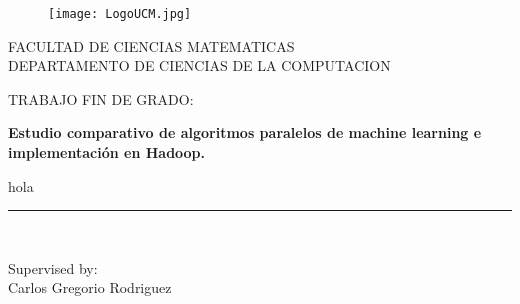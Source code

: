 \begin{titlepage}

\begin{center}

	\vspace*{-1in}
	
	\begin{figure}[htb]
		\begin{center}
			\texttt{[image: LogoUCM.jpg]}
		\end{center}
	\end{figure}

	FACULTAD DE CIENCIAS MATEMATICAS\\
	\vspace*{0.15in}
	DEPARTAMENTO DE CIENCIAS DE LA COMPUTACION \\
	\vspace*{0.6in}
	
	\begin{large}
		TRABAJO FIN DE GRADO:\\
	\end{large}
	
	\vspace*{0.2in}
	
	\begin{Large}
		\textbf{Estudio comparativo de algoritmos paralelos de machine learning e 
		implementación en Hadoop. } \\
	\end{Large}
	
	\vspace*{0.3in}
	
	\begin{large}
		hola\\
	\end{large}
	
	\vspace*{0.3in}
	\rule{80mm}{0.1mm}\\
	\vspace*{0.1in}
	
	\begin{large}
		Supervised by: \\
		Carlos Gregorio Rodriguez \\
	\end{large}
	
\end{center}

\end{titlepage}